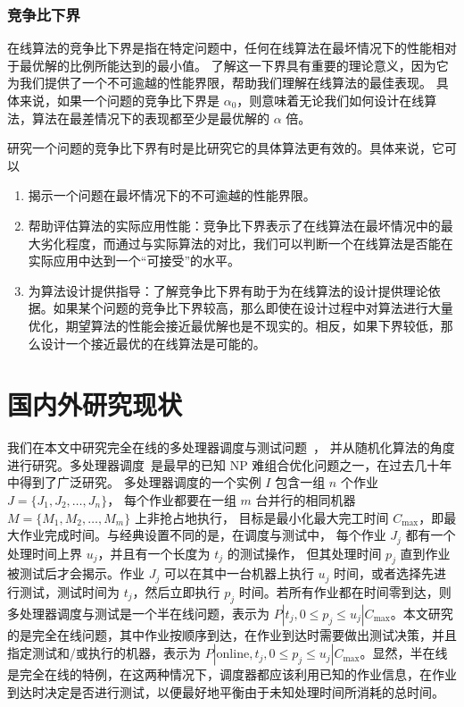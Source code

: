 \subsubsection{竞争比下界}

在线算法的竞争比下界是指在特定问题中，任何在线算法在最坏情况下的性能相对于最优解的比例所能达到的最小值。
了解这一下界具有重要的理论意义，因为它为我们提供了一个不可逾越的性能界限，帮助我们理解在线算法的最佳表现。
具体来说，如果一个问题的竞争比下界是 $\alpha_0$，则意味着无论我们如何设计在线算法，算法在最差情况下的表现都至少是最优解的 $\alpha$ 倍。

研究一个问题的竞争比下界有时是比研究它的具体算法更有效的。具体来说，它可以
\begin{enumerate}
    \item 揭示一个问题在最坏情况下的不可逾越的性能界限。
    \item 帮助评估算法的实际应用性能：竞争比下界表示了在线算法在最坏情况中的最大劣化程度，而通过与实际算法的对比，我们可以判断一个在线算法是否能在实际应用中达到一个“可接受”的水平。
    \item 为算法设计提供指导：了解竞争比下界有助于为在线算法的设计提供理论依据。如果某个问题的竞争比下界较高，那么即使在设计过程中对算法进行大量优化，期望算法的性能会接近最优解也是不现实的。相反，如果下界较低，那么设计一个接近最优的在线算法是可能的。
\end{enumerate}

\section{国内外研究现状}

我们在本文中研究完全在线的多处理器调度与测试问题~\cite{durr2018scheduling,durr2020adversarial,albers2021explorable,albers2021scheduling}，
并从随机化算法的角度进行研究。多处理器调度~\cite{garey1979computers}是最早的已知 NP 难组合优化问题之一，在过去几十年中得到了广泛研究。
多处理器调度的一个实例 \( I \) 包含一组 \( n \) 个作业 \( J = \{J_1, J_2, \dots, J_n\} \)，
每个作业都要在一组 \( m \) 台并行的相同机器 \( M = \{M_1, M_2, \dots, M_m\} \) 上非抢占地执行，
目标是最小化最大完工时间 \( C_{\text{max}} \)，即最大作业完成时间。与经典设置不同的是，在调度与测试中，
每个作业 \( J_j \) 都有一个处理时间上界 \( u_j \)，并且有一个长度为 \( t_j \) 的测试操作，
但其处理时间 \( p_j \) 直到作业被测试后才会揭示。作业 \( J_j \) 可以在其中一台机器上执行 \( u_j \) 时间，或者选择先进行测试，测试时间为 \( t_j \)，然后立即执行 \( p_j \) 时间。若所有作业都在时间零到达，则多处理器调度与测试是一个半在线问题，表示为 \( P | t_j, 0 \leq p_j \leq u_j | C_{\text{max}} \)。本文研究的是完全在线问题，其中作业按顺序到达，在作业到达时需要做出测试决策，并且指定测试和/或执行的机器，表示为 \( P | \text{online}, t_j, 0 \leq p_j \leq u_j | C_{\text{max}} \)。显然，半在线是完全在线的特例，在这两种情况下，调度器都应该利用已知的作业信息，在作业到达时决定是否进行测试，以便最好地平衡由于未知处理时间所消耗的总时间。

